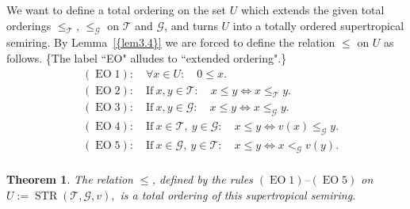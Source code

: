 \documentclass [12pt,a4paper,reqno]{amsart}
\newtheorem{thm}{Theorem} [section]
\begin{document}
We want to define a total ordering on the set $U$ which extends
the given total orderings $\le_{\mathcal T}$, $\le_{\mathcal G}$ on ${\mathcal T}$ and
${\mathcal G} $, and turns $U$ into a totally ordered supertropical
semiring. By {Lemma~\ref{{lem3.4}}} we are forced to define the relation
$\le$ on $U$ as follows. \{The label ``EO" alludes to ``extended
ordering".\}
\begin{align*}
& ({\operatorname{EO}}1): \quad   \forall x\in U:\quad  0\le x.  \\
& ({\operatorname{EO}}2): \quad  \text{If}\  x,y\in {\mathcal T}:\quad x\le
y\Leftrightarrow
x\le_{\mathcal T} y. \\
& ({\operatorname{EO}}3): \quad   \text{If}\ x,y\in {\mathcal G}:\quad  x\le
y\Leftrightarrow x\le_{\mathcal G}
y.  \\
& ({\operatorname{EO}}4): \quad  \text{If}\ x \in {\mathcal T},\ y\in{\mathcal G} :\quad x\le
y\Leftrightarrow
v(x)\le_{\mathcal G} y.  \\
& ({\operatorname{EO}}5): \quad   \text{If}\ x\in {\mathcal G} ,\ y\in{\mathcal T} :\quad x\le
y\Leftrightarrow x<_{\mathcal G} v(y).  \\
\end{align*}

\begin{thm}\label{thm3.5}
The relation $\le$, defined by the rules {\rm$({\operatorname{EO}}1)$--$({\operatorname{EO}}5)$}
on $U:={\operatorname{STR}}({\mathcal T},{\mathcal G} ,v),$ is a total ordering of this
supertropical semiring.
\end{thm}
\end{document}
